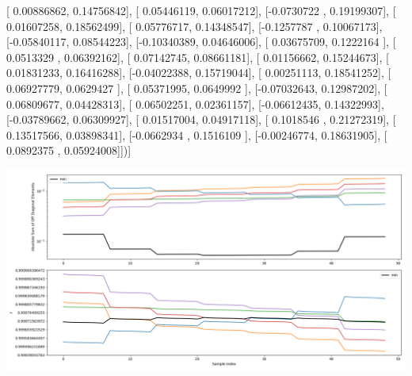 \documentclass{article}
\begin{document}
       [ 0.00886862,  0.14756842],
       [ 0.05446119,  0.06017212],
       [-0.0730722 ,  0.19199307],
       [ 0.01607258,  0.18562499],
       [ 0.05776717,  0.14348547],
       [-0.1257787 ,  0.10067173],
       [-0.05840117,  0.08544223],
       [-0.10340389,  0.04646006],
       [ 0.03675709,  0.1222164 ],
       [ 0.0513329 ,  0.06392162],
       [ 0.07142745,  0.08661181],
       [ 0.01156662,  0.15244673],
       [ 0.01831233,  0.16416288],
       [-0.04022388,  0.15719044],
       [ 0.00251113,  0.18541252],
       [ 0.06927779,  0.0629427 ],
       [ 0.05371995,  0.0649992 ],
       [-0.07032643,  0.12987202],
       [ 0.06809677,  0.04428313],
       [ 0.06502251,  0.02361157],
       [-0.06612435,  0.14322993],
       [-0.03789662,  0.06309927],
       [ 0.01517004,  0.04917118],
       [ 0.1018546 ,  0.21272319],
       [ 0.13517566,  0.03898341],
       [-0.0662934 ,  0.1516109 ],
       [-0.00246774,  0.18631905],
       [ 0.0892375 ,  0.05924008]])]
\begin{center}
\includegraphics[scale=.9]{report_pickled_controls139/control_dpn_all.png}

\end{center}
\end{document}
